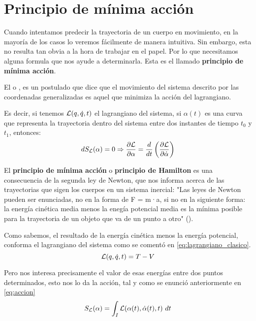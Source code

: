 \section{Principio de mínima acción}\label{sec:principio-de-minima-accion}

Cuando intentamos predecir la trayectoria de un cuerpo en movimiento, en la mayoría de los casos lo veremos fácilmente de manera intuitiva. Sin embargo, esta no resulta tan obvia a la hora de trabajar en el papel. Por lo que necesitamos alguna formula que nos ayude a determinarla. Esta es el llamado \textbf{principio de mínima acción}.

El  o , es un postulado que dice que el movimiento del sistema descrito por las coordenadas generalizadas es aquel que minimiza la acción del lagrangiano.

Es decir, si tenemos $\mathcal{L}(q,\dot{q}, t)$ el lagrangiano del sistema, si $\alpha(t)$ es una curva que representa la trayectoria dentro del sistema entre dos instantes de tiempo $t_0$ y $t_1$, entonces:
\begin{equation*}
	dS_{\mathcal{L}}(\alpha)=0\Rightarrow \frac{\partial \mathcal{L}}{\partial \alpha}=\frac{d}{dt}\left( \frac{\partial \mathcal{L}}{\partial \dot{\alpha}} \right)
\end{equation*}

El \textbf{principio de mínima acción} o \textbf{principio de Hamilton} es una consecuencia de la segunda ley de Newton, que nos informa acerca de las trayectorias que sigen los cuerpos en un sistema inercial:
"Las leyes de Newton pueden ser enunciadas, no en la forma de F = m·a, si no en la siguiente forma: la energía cinética media menos la enegía potencial media es la mínima posible para la trayectoria de un objeto que va de un punto a otro" (\cite{Feynman}).

Como sabemos, el resultado de la energía cinética menos la energía potencial, conforma el lagrangiano del sistema como se comentó en \eqref{eq:lagrangiano_clasico}.
\begin{equation}
	\label{eq:lagrangiano_clasico_corto}
	\mathcal{L}(q,\dot{q},t)=T-V
\end{equation}

Pero nos interesa precisamente el valor de esas energías entre dos puntos determinados, esto nos lo da la acción, tal y como se enunció anteriormente en \eqref{eq:accion}
\begin{equation}
	S_{\mathcal{L}}(\alpha) = \int_{I}\mathcal{L}(\alpha(t), \dot{\alpha}(t), t)\ dt
\end{equation}

